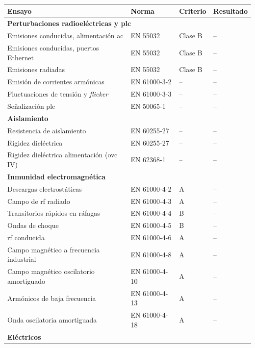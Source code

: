 \begin{table}[!h]
\centering
\small
\begin{tabular}{|p{6.4cm}|p{3.4cm}|p{1.6cm}|p{2.4cm}|}
\hline
\textbf{Ensayo} & \textbf{Norma} & \textbf{Criterio} & \textbf{Resultado} \\ \hline
\multicolumn{4}{|l|}{\textbf{Perturbaciones radioeléctricas y \gls{plc}}} \\ \hline
Emisiones conducidas, alimentación \gls{ac} & EN 55032 & Clase B & -- \\ \hline
Emisiones conducidas, puertos Ethernet & EN 55032 & Clase B & -- \\ \hline
Emisiones radiadas & EN 55032 & Clase B & -- \\ \hline
Emisión de corrientes armónicas & EN 61000-3-2 & -- & -- \\ \hline
Fluctuaciones de tensión y \textit{flicker} & EN 61000-3-3 & -- & -- \\ \hline
Señalización \gls{plc} & EN 50065-1 & -- & -- \\ \hline
\multicolumn{4}{|l|}{\textbf{Aislamiento}} \\ \hline
Resistencia de aislamiento & EN 60255-27 & -- & -- \\ \hline
Rigidez dieléctrica & EN 60255-27 & -- & -- \\ \hline
Rigidez dieléctrica alimentación (\gls{ovc} IV) & EN 62368-1 & -- & -- \\ \hline
\multicolumn{4}{|l|}{\textbf{Inmunidad electromagnética}} \\ \hline
Descargas electrostáticas & EN 61000-4-2 & A & -- \\ \hline
Campo de \gls{rf} radiado & EN 61000-4-3 & A & -- \\ \hline
Transitorios rápidos en ráfagas & EN 61000-4-4 & B & -- \\ \hline
Ondas de choque & EN 61000-4-5 & B & -- \\ \hline
\gls{rf} conducida & EN 61000-4-6 & A & -- \\ \hline
Campo magnético a frecuencia industrial & EN 61000-4-8 & A & -- \\ \hline
Campo magnético oscilatorio amortiguado & EN 61000-4-10 & A & -- \\ \hline
Armónicos de baja frecuencia & EN 61000-4-13 & A & -- \\ \hline
Onda oscilatoria amortiguada & EN 61000-4-18 & A & -- \\ \hline
\multicolumn{4}{|l|}{\textbf{Eléctricos}} \\ \hline

\end{tabular}
\end{table}
